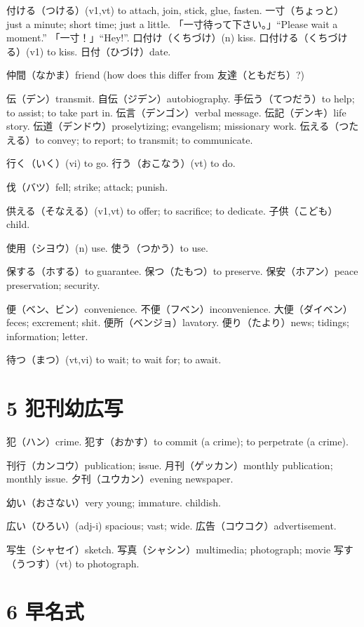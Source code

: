 付ける（つける）(v1,vt) to attach, join, stick, glue, fasten.
一寸（ちょっと）just a minute; short time; just a little.
「一寸待って下さい。」``Please wait a moment.''
「一寸！」``Hey!''.
口付け（くちづけ）(n) kiss.
口付ける（くちづける）(v1) to kiss.
日付（ひづけ）date.

仲間（なかま）friend (how does this differ from 友達（ともだち）?)

伝（デン）transmit.
自伝（ジデン）autobiography.
手伝う（てつだう）to help; to assist; to take part in.
伝言（デンゴン）verbal message.
伝記（デンキ）life story.
伝道（デンドウ）proselytizing; evangelism; missionary work.
伝える（つたえる）to convey; to report; to transmit; to communicate.

行く（いく）(vi) to go.
行う（おこなう）(vt) to do.

伐（バツ）fell; strike; attack; punish.

供える（そなえる）(v1,vt) to offer; to sacrifice; to dedicate.
子供（こども）child.

使用（シヨウ）(n) use.
使う（つかう）to use.

保する（ホする）to guarantee.
保つ（たもつ）to preserve.
保安（ホアン）peace preservation; security.

便（ベン、ビン）convenience.
不便（フベン）inconvenience.
大便（ダイベン）feces; excrement; shit.
便所（ベンジョ）lavatory.
便り（たより）news; tidings; information; letter.

待つ（まつ）(vt,vi) to wait; to wait for; to await.

\section{5 犯刊幼広写}

犯（ハン）crime.
犯す（おかす）to commit (a crime); to perpetrate (a crime).

刊行（カンコウ）publication; issue.
月刊（ゲッカン）monthly publication; monthly issue.
夕刊（ユウカン）evening newspaper.

幼い（おさない）very young; immature. childish.

広い（ひろい）(adj-i) spacious; vast; wide.
広告（コウコク）advertisement.

写生（シャセイ）sketch.
写真（シャシン）multimedia; photograph; movie
写す（うつす）(vt) to photograph.

\section{6 早名式}

